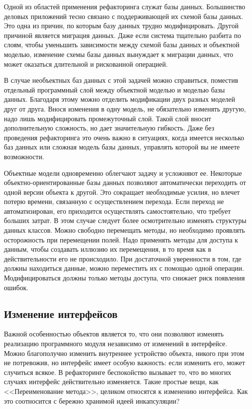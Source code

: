 \documentclass{../../text-style}
\begin{document}
Одной из областей применения рефакторинга служат базы данных. Большинство деловых приложений тесно связано с поддерживающей их схемой базы данных. Это одна из причин, по которым базу данных трудно модифицировать. Другой причиной является миграция данных. Даже если система тщательно разбита по слоям, чтобы уменьшить зависимости между схемой базы данных и объектной моделью, изменение схемы базы данных вынуждает к миграции данных, что может оказаться длительной и рискованной операцией.

В случае необъектных баз данных с этой задачей можно справиться, поместив отдельный программный слой между объектной моделью и моделью базы данных. Благодаря этому можно отделить модификации двух разных моделей друг от друга. Внося изменения в одну модель, не обязательно изменять другую, надо лишь модифицировать промежуточный слой. Такой слой вносит дополнительную сложность, но дает значительную гибкость. Даже без проведения рефакторинга это очень важно в ситуациях, когда имеется несколько баз данных или сложная модель базы данных, управлять которой вы не имеете возможности.

Объектные модели одновременно облегчают задачу и усложняют ее. Некоторые объектно-ориентированные базы данных позволяют автоматически переходить от одной версии объекта к другой. Это сокращает необходимые усилия, но влечет потерю времени, связанную с осуществлением перехода. Если переход не автоматизирован, его приходится осуществлять самостоятельно, что требует больших затрат. В этом случае следует более осмотрительно изменять структуры данных классов. Можно свободно перемещать методы, но необходимо проявлять осторожность при перемещении полей. Надо применять методы для доступа к данным, чтобы создавать иллюзию их перемещения, в то время как в действительности его не происходило. При достаточной уверенности в том, где должны находиться данные, можно переместить их с помощью одной операции. Модифицироваться должны только методы доступа, что снижает риск появления ошибок.

\subsection{Изменение интерфейсов}

Важной особенностью объектов является то, что они позволяют изменять реализацию программного модуля независимо от изменений в интерфейсе. Можно благополучно изменить внутреннее устройство объекта, никого при этом не потревожив, но интерфейс имеет особую важность: если изменить его, может случиться всякое. В рефакторинге беспокойство вызывает то, что во многих случаях интерфейс действительно изменяется. Такие простые вещи, как <<Переименование метода>>, целиком относятся к изменению интерфейса. Как это соотносится с бережно хранимой идеей инкапсуляции?
\end{document}
